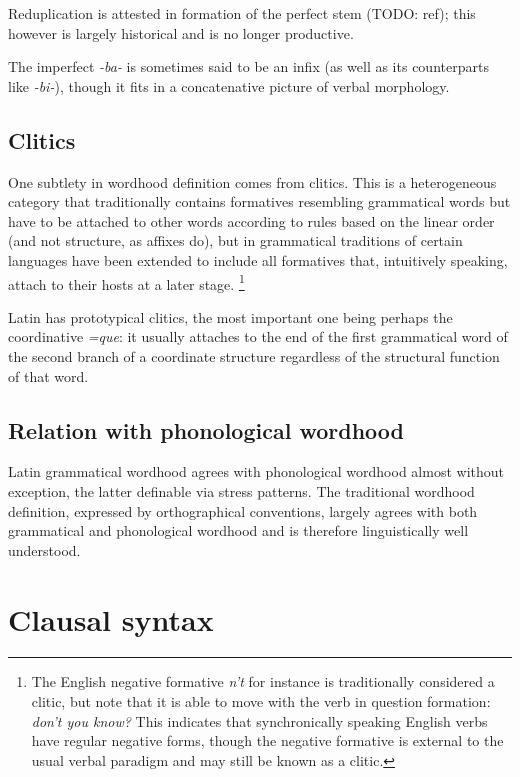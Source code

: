 \documentclass[a4paper, oneside, 12pt]{report}
\newcommand{\form}[1]{\emph{#1}}
\begin{document}
Reduplication is attested in 
formation of the perfect stem (TODO: ref);
this however is largely historical and is no longer productive.

The imperfect \form{-ba-} is sometimes said to be an infix 
(as well as its counterparts like \form{-bi-}),
though it fits in a concatenative picture of verbal morphology.



\subsection{Clitics}\label{sec:grammatical.word.clitic}

One subtlety in wordhood definition comes from clitics.
This is a heterogeneous category that traditionally contains formatives resembling grammatical words but have to be attached to other words according to rules based on the linear order (and not structure, as affixes do), but in grammatical traditions of certain languages have been extended to include all formatives that, intuitively speaking, attach to their hosts at a later stage.%
\footnote{
    The English negative formative \form{n't} for instance is traditionally considered a clitic, but note that it is able to move with the verb in question formation: \form{don't you know?}
    This indicates that synchronically speaking English verbs have regular negative forms, though the negative formative is external to the usual verbal paradigm and may still be known as a clitic.
}

Latin has prototypical clitics, the most important one being perhaps the coordinative \form{=que}: 
it usually attaches to the end of the first grammatical word of the second branch of a coordinate structure regardless of the structural function of that word.

\subsection{Relation with phonological wordhood}

Latin grammatical wordhood agrees with phonological wordhood almost without exception, the latter definable via stress patterns.
The traditional wordhood definition, expressed by orthographical conventions, largely agrees with both grammatical and phonological wordhood and is therefore linguistically well understood.

\section{Clausal syntax}\label{sec:grammatical.clause}
\end{document}
